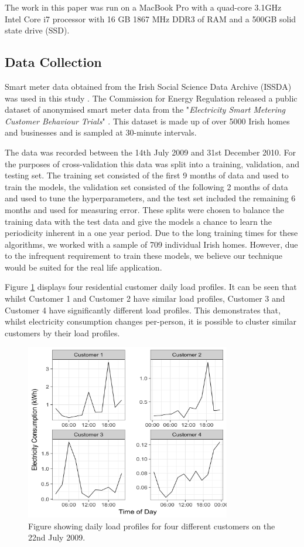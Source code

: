 The work in this paper was run on a MacBook Pro with a quad-core 3.1GHz Intel Core i7 processor with 16 GB 1867 MHz DDR3 of RAM and a 500GB solid state drive (SSD).

\subsection{Data Collection}

Smart meter data obtained from the Irish Social Science Data Archive (ISSDA) was used in this study \cite{cer_2012}. The Commission for Energy Regulation released a public dataset of anonymised smart meter data from the "\textit{Electricity Smart Metering Customer Behaviour Trials}" \cite{setis}. This dataset is made up of over 5000 Irish homes and businesses and is sampled at 30-minute intervals.

The data was recorded between the 14th July 2009 and 31st December 2010. For the purposes of cross-validation this data was split into a training, validation, and testing set. The training set consisted of the first 9 months of data and used to train the models, the validation set consisted of the following 2 months of data and used to tune the hyperparameters, and the test set included the remaining 6 months and used for measuring error. These splits were chosen to balance the training data with the test data and give the models a chance to learn the periodicity inherent in a one year period. Due to the long training times for these algorithms, we worked with a sample of 709 individual Irish homes. However, due to the infrequent requirement to train these models, we believe our technique would be suited for the real life application.

Figure \ref{fig:similar_customers} displays four residential customer daily load profiles. It can be seen that whilst Customer 1 and Customer 2 have similar load profiles, Customer 3 and Customer 4 have significantly different load profiles.  This demonstrates that, whilst electricity consumption changes per-person, it is possible to cluster similar customers by their load profiles.
\begin{figure}[b]
	\includegraphics[width=0.8\textwidth]{Chapter5/figures/Webp_net-resizeimage.png}
	\caption{Figure showing daily load profiles for four different customers on the 22nd July 2009.}
	\label{fig:similar_customers}
\end{figure}
